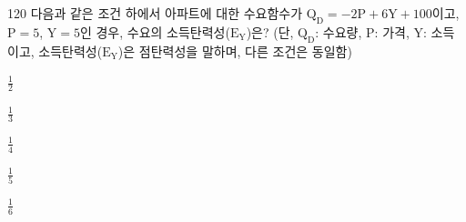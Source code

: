 \begin{question}{120}
다음과 같은 조건 하에서 아파트에 대한 수요함수가 $\mathrm{Q_D=-2P+6Y+100}$이고, $\mathrm{P=5}$, $\mathrm{Y=5}$인 경우, 수요의 소득탄력성($\mathrm{E_Y}$)은? (단, $\mathrm{Q_D}$: 수요량, $\mathrm{P}$: 가격, $\mathrm{Y}$: 소득이고, 소득탄력성($\mathrm{E_Y}$)은 점탄력성을 말하며, 다른 조건은 동일함)
\begin{choices}
  \item $\frac{1}{2}$
  \item $\frac{1}{3}$
  \item $\frac{1}{4}$
  \item $\frac{1}{5}$
  \item $\frac{1}{6}$
\end{choices}
\end{question}
